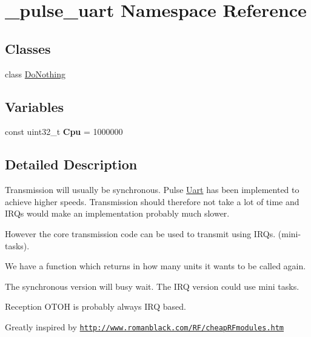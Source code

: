 \hypertarget{namespace__pulse__uart}{}\section{\+\_\+pulse\+\_\+uart Namespace Reference}
\label{namespace__pulse__uart}
\subsection*{Classes}
\begin{DoxyCompactItemize}
\item 
class \hyperlink{class__pulse__uart_1_1DoNothing}{Do\+Nothing}
\end{DoxyCompactItemize}
\subsection*{Variables}
\begin{DoxyCompactItemize}
\item 
const uint32\+\_\+t {\bfseries Cpu} = 1000000\hypertarget{namespace__pulse__uart_a54a3816b5d606db8b8ca8bcb568eeb85}{}\label{namespace__pulse__uart_a54a3816b5d606db8b8ca8bcb568eeb85}

\end{DoxyCompactItemize}


\subsection{Detailed Description}
Transmission will usually be synchronous. Pulse \hyperlink{classUart}{Uart} has been implemented to achieve higher speeds. Transmission should therefore not take a lot of time and I\+R\+Qs would make an implementation probably much slower.

However the core transmission code can be used to transmit using I\+R\+Qs. (mini-\/tasks).

We have a function which returns in how many units it wants to be called again.

The synchronous version will busy wait. The I\+RQ version could use mini tasks.

Reception O\+T\+OH is probably always I\+RQ based.

Greatly inspired by \href{http://www.romanblack.com/RF/cheapRFmodules.htm}{\tt http\+://www.\+romanblack.\+com/\+R\+F/cheap\+R\+Fmodules.\+htm} 